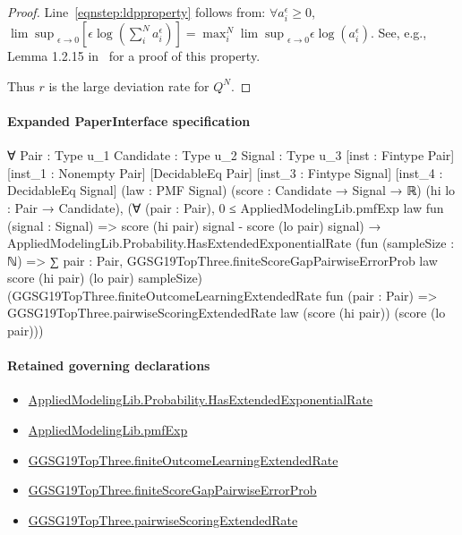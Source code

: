 \documentclass[10pt]{article}
\begin{document}
\begin{ReviewVerbatim}
\begin{proof}
Line~\eqref{eqnstep:ldpproperty} follows from: $\forall a^\epsilon_i \geq 0$, ${\lim \sup}_{\epsilon \to 0} \left[\epsilon\log\left(\sum_i^N a^\epsilon_i\right)\right] = \max^N_i {\lim \sup}_{\epsilon \to 0} \epsilon \log(a^\epsilon_i)$.
See, e.g., Lemma 1.2.15 in~\cite{dembo_large_2010} for a proof of this property.

Thus $r$ is the large deviation rate for $Q^N$.

\end{proof}
\end{ReviewVerbatim}



\paragraph{Expanded PaperInterface specification}
\begin{ReviewVerbatim}
∀ {Pair : Type u_1} {Candidate : Type u_2} {Signal : Type u_3} [inst : Fintype Pair] [inst_1 : Nonempty Pair]
  [DecidableEq Pair] [inst_3 : Fintype Signal] [inst_4 : DecidableEq Signal] (law : PMF Signal)
  (score : Candidate → Signal → ℝ) (hi lo : Pair → Candidate),
  (∀ (pair : Pair),
      0 ≤ AppliedModelingLib.pmfExp law fun (signal : Signal) => score (hi pair) signal - score (lo pair) signal) →
    AppliedModelingLib.Probability.HasExtendedExponentialRate
      (fun (sampleSize : ℕ) =>
        ∑ pair : Pair, GGSG19TopThree.finiteScoreGapPairwiseErrorProb law score (hi pair) (lo pair) sampleSize)
      (GGSG19TopThree.finiteOutcomeLearningExtendedRate fun (pair : Pair) =>
        GGSG19TopThree.pairwiseScoringExtendedRate law (score (hi pair)) (score (lo pair)))
\end{ReviewVerbatim}

\paragraph{Retained governing declarations}
\begin{itemize}\raggedright
\item \hyperlink{governing-declaration-2dc367e1cad78521}{Applied\allowbreak{}Modeling\allowbreak{}Lib.\allowbreak{}Probability.\allowbreak{}Has\allowbreak{}Extended\allowbreak{}Exponential\allowbreak{}Rate}
\item \hyperlink{governing-declaration-8e4b4389a4f6454b}{Applied\allowbreak{}Modeling\allowbreak{}Lib.\allowbreak{}pmf\allowbreak{}Exp}
\item \hyperlink{governing-declaration-1e37322bd4d458f4}{GGSG19\allowbreak{}Top\allowbreak{}Three.\allowbreak{}finite\allowbreak{}Outcome\allowbreak{}Learning\allowbreak{}Extended\allowbreak{}Rate}
\item \hyperlink{governing-declaration-d8a6ed8ce06dfbde}{GGSG19\allowbreak{}Top\allowbreak{}Three.\allowbreak{}finite\allowbreak{}Score\allowbreak{}Gap\allowbreak{}Pairwise\allowbreak{}Error\allowbreak{}Prob}
\item \hyperlink{governing-declaration-167dd240ed67fe52}{GGSG19\allowbreak{}Top\allowbreak{}Three.\allowbreak{}pairwise\allowbreak{}Scoring\allowbreak{}Extended\allowbreak{}Rate}
\end{itemize}
\end{document}
